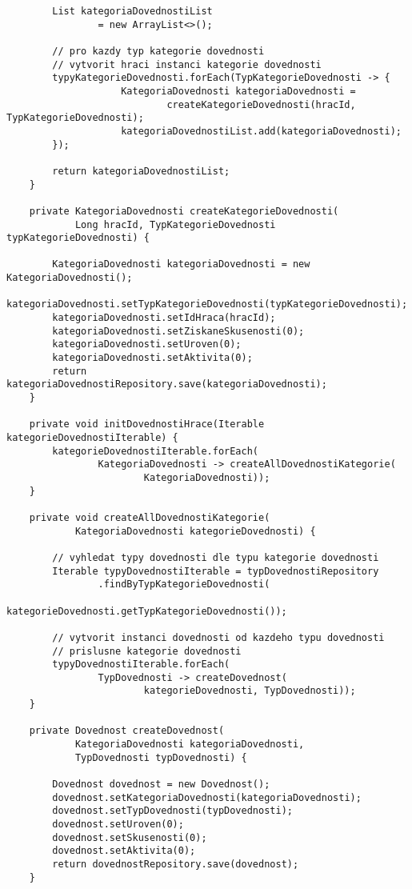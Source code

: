 \documentclass[twoside, 12pt]{article}
\begin{document}
{\begin{lstlisting}
        List kategoriaDovednostiList
                = new ArrayList<>();

        // pro kazdy typ kategorie dovednosti
        // vytvorit hraci instanci kategorie dovednosti
        typyKategorieDovednosti.forEach(TypKategorieDovednosti -> {
                    KategoriaDovednosti kategoriaDovednosti =
                            createKategorieDovednosti(hracId, TypKategorieDovednosti);
                    kategoriaDovednostiList.add(kategoriaDovednosti);
        });

        return kategoriaDovednostiList;
    }

    private KategoriaDovednosti createKategorieDovednosti(
            Long hracId, TypKategorieDovednosti typKategorieDovednosti) {

        KategoriaDovednosti kategoriaDovednosti = new KategoriaDovednosti();
        kategoriaDovednosti.setTypKategorieDovednosti(typKategorieDovednosti);
        kategoriaDovednosti.setIdHraca(hracId);
        kategoriaDovednosti.setZiskaneSkusenosti(0);
        kategoriaDovednosti.setUroven(0);
        kategoriaDovednosti.setAktivita(0);
        return kategoriaDovednostiRepository.save(kategoriaDovednosti);
    }

    private void initDovednostiHrace(Iterable kategorieDovednostiIterable) {
        kategorieDovednostiIterable.forEach(
                KategoriaDovednosti -> createAllDovednostiKategorie(
                        KategoriaDovednosti));
    }

    private void createAllDovednostiKategorie(
            KategoriaDovednosti kategorieDovednosti) {

        // vyhledat typy dovednosti dle typu kategorie dovednosti
        Iterable typyDovednostiIterable = typDovednostiRepository
                .findByTypKategorieDovednosti(
                        kategorieDovednosti.getTypKategorieDovednosti());

        // vytvorit instanci dovednosti od kazdeho typu dovednosti
        // prislusne kategorie dovednosti
        typyDovednostiIterable.forEach(
                TypDovednosti -> createDovednost(
                        kategorieDovednosti, TypDovednosti));
    }

    private Dovednost createDovednost(
            KategoriaDovednosti kategoriaDovednosti,
            TypDovednosti typDovednosti) {

        Dovednost dovednost = new Dovednost();
        dovednost.setKategoriaDovednosti(kategoriaDovednosti);
        dovednost.setTypDovednosti(typDovednosti);
        dovednost.setUroven(0);
        dovednost.setSkusenosti(0);
        dovednost.setAktivita(0);
        return dovednostRepository.save(dovednost);
    }



\end{lstlisting}}
\end{document}
